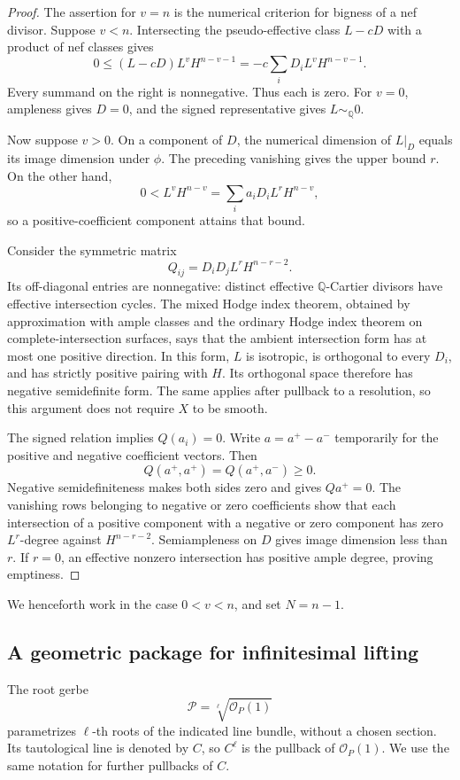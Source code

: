 \documentclass[11pt,letterpaper]{article}
\newcommand{\Q}{\mathbb{Q}}
\newcommand{\OO}{\mathcal{O}}
\theoremstyle{definition}
\theoremstyle{remark}
\begin{document}
\begin{proof}
The assertion for $v=n$ is the numerical criterion for bigness of a
nef divisor.  Suppose $v<n$.  Intersecting the pseudo-effective class
$L-cD$ with a product of nef classes gives
\[
 0\le (L-cD)L^vH^{n-v-1}
    =-c\sum_iD_iL^vH^{n-v-1}.
\]
Every summand on the right is nonnegative.  Thus each is zero.
For $v=0$, ampleness gives $D=0$, and the signed representative gives
$L\sim_{\Q}0$.

Now suppose $v>0$.  On a component of $D$, the numerical dimension
of $L|_D$ equals its image dimension under $\phi$.  The preceding
vanishing gives the upper bound $r$.  On the other hand,
\[
 0<L^vH^{n-v}=\sum_i a_iD_iL^rH^{n-v},
\]
so a positive-coefficient component attains that bound.

Consider the symmetric matrix
\[
 Q_{ij}=D_iD_jL^rH^{n-r-2}.
\]
Its off-diagonal entries are nonnegative: distinct effective
$\Q$-Cartier divisors have effective intersection cycles.  The mixed
Hodge index theorem, obtained by approximation with ample classes
and the ordinary Hodge index theorem on complete-intersection
surfaces, says that the ambient intersection form has at most one
positive direction.  In this form, $L$ is isotropic, is orthogonal
to every $D_i$, and has strictly positive pairing with $H$.
Its orthogonal space therefore has negative semidefinite form.
The same applies after pullback to a resolution, so this argument
does not require $X$ to be smooth.

The signed relation implies $Q(a_i)=0$.  Write $a=a^+-a^-$
temporarily for the positive and negative coefficient vectors.
Then
\[
 Q(a^+,a^+)=Q(a^+,a^-)\ge0.
\]
Negative semidefiniteness makes both sides zero and gives
$Qa^+=0$.  The vanishing rows belonging to negative or zero
coefficients show that each intersection of a positive component
with a negative or zero component has zero $L^r$-degree against
$H^{n-r-2}$.  Semiampleness on $D$ gives image dimension less than
$r$.  If $r=0$, an effective nonzero intersection has positive
ample degree, proving emptiness.
\end{proof}

We henceforth work in the case $0<v<n$, and set $N=n-1$.

\subsection{A geometric package for infinitesimal lifting}

The root gerbe
\[
 \mathcal P=\sqrt[\ell]{\OO_P(1)}
\]
parametrizes $\ell$-th roots of the indicated line bundle, without
a chosen section.  Its tautological line is denoted by $C$, so
$C^\ell$ is the pullback of $\OO_P(1)$.  We use the same notation
for further pullbacks of $C$.
\end{document}
